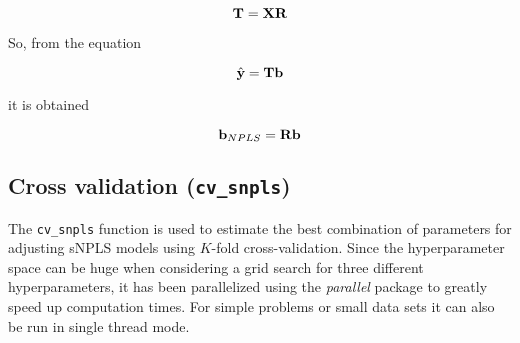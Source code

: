 \begin{equation}
    \textbf{\text{T}}=\textbf{\text{XR}}
\end{equation}

So, from the equation

\begin{equation}
    \hat{\textbf{\text{y}}}=\textbf{\text{Tb}}
\end{equation}

it is obtained

\begin{equation}
    \textbf{\text{b}}_{NPLS}=\textbf{\text{Rb}}
\end{equation}

\subsection{Cross validation (\texttt{cv\_snpls})}
The \texttt{cv\_snpls} function is used to estimate the best combination of parameters for adjusting sNPLS models using $K$-fold cross-validation. Since the hyperparameter space can be huge when considering a grid search for three different hyperparameters, it has been parallelized using the \textit{parallel} package to greatly speed up computation times. For simple problems or small data sets it can also be run in single thread mode.
\vspace{15pt}
